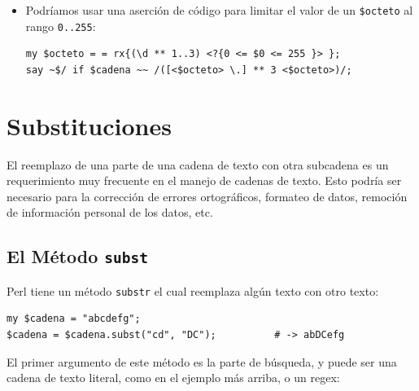 \begin{itemize}
\begin{verbatim}
my $octeto = rx { (   25 <[0..5]>       # 250 a 255
                   || 2  <[0..4]> \d     # 200 a 249
                   || 1  \d ** 2         # 100 a 199
                   || \d ** 1..2         # 0 a 99 
                 )
               };
say ~$/ if $cadena ~~ /([<$octeto> \.] ** 3 <$octeto>)/;
\end{verbatim}
%

Esta definición de \verb|$octeto| ilustra una vez más cómo
el uso abundante de espacios en blanco y comentarios ayudan
a hacer la intención más clara.

\item Podríamos usar una aserción de código para limitar el
valor de un \verb|$octeto| al rango \verb|0..255|:

\begin{verbatim}
my $octeto = = rx{(\d ** 1..3) <?{0 <= $0 <= 255 }> };
say ~$/ if $cadena ~~ /([<$octeto> \.] ** 3 <$octeto>)/;
\end{verbatim}
%

\end{itemize}


\section{Substituciones}
\label{substitutions}

El reemplazo de una parte de una cadena de texto con otra 
subcadena es un requerimiento muy frecuente en el manejo
de cadenas de texto. Esto podría ser necesario para la
corrección de errores ortográficos, formateo de datos, 
remoción de información personal de los datos, etc.

\subsection{El Método {\tt subst}}

Perl tiene un método {\tt substr} el cual reemplaza algún
texto con otro texto:

\begin{verbatim}
my $cadena = "abcdefg";
$cadena = $cadena.subst("cd", "DC");          # -> abDCefg
\end{verbatim}

El primer argumento de este método es la parte de búsqueda, 
y puede ser una cadena de texto literal, como en el ejemplo
más arriba, o un regex:

